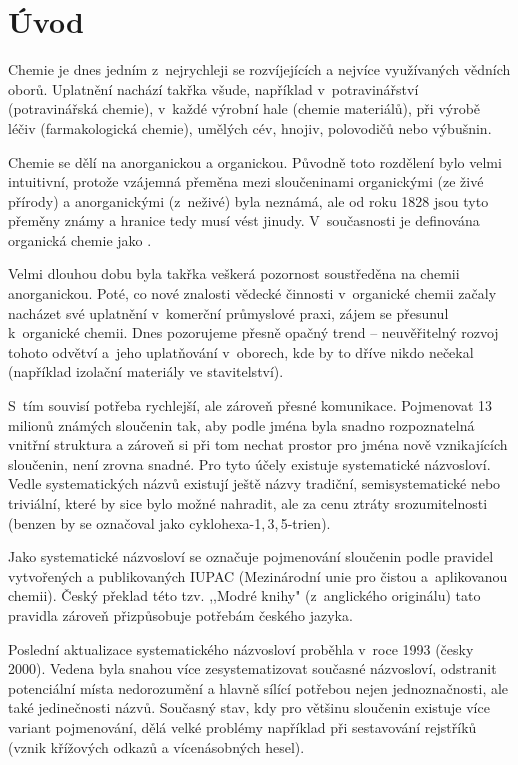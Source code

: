 \chapter{Úvod}
Chemie je dnes jedním z~nejrychleji se rozvíjejících a nejvíce využívaných
vědních oborů. Uplatnění nachází takřka všude, například v~potravinářství
(potravinářská chemie), v~každé výrobní hale (chemie materiálů), při výrobě
léčiv (farmakologická chemie), umělých cév, hnojiv, polovodičů nebo vý\-buš\-nin.

Chemie se dělí na anorganickou a organickou. Původně toto rozdělení bylo velmi
intuitivní, protože vzájemná přeměna mezi sloučeninami organickými (ze živé
přírody) a anorganickými (z~neživé) byla neznámá, ale od roku 1828 jsou tyto
přeměny známy a hranice tedy musí vést jinudy. V~současnosti je definována
organická chemie jako .

Velmi dlouhou dobu byla takřka veškerá pozornost soustředěna na chemii
anorganickou. Poté, co nové znalosti vědecké činnosti v~organické chemii začaly
nacházet své uplatnění v~komerční průmyslové praxi, zájem se pře\-su\-nul
k~organické chemii. Dnes pozorujeme přesně opačný trend -- neuvěřitelný rozvoj
tohoto odvětví a~jeho uplatňování v~oborech, kde by to dříve nikdo nečekal
(například izolační materiály ve stavitelství).

S~tím souvisí potřeba rychlejší, ale zároveň přesné komunikace. Pojmenovat
13\,milionů známých sloučenin tak, aby podle jména byla snadno rozpoznatelná
vnitřní struktura a zároveň si při tom nechat prostor pro jména nově
vznikajících sloučenin, není zrovna snadné. Pro tyto účely existuje systematické
názvosloví. Vedle systematických názvů existují ještě názvy tradiční,
semisystematické nebo triviální, které by sice bylo možné nahradit, ale za cenu
ztráty srozumitelnosti (benzen by se označoval jako cyklohexa-1,\,3,\,5-trien).

Jako systematické názvosloví se označuje pojmenování sloučenin podle pravidel
vytvořených a publikovaných IUPAC (Mezinárodní unie pro čistou a~aplikovanou
chemii). Český překlad této tzv. ,,Modré knihy" (z~anglického originálu) tato
pravidla zároveň přizpůsobuje potřebám českého jazyka.

Poslední aktualizace systematického názvosloví proběhla v~roce 1993
(čes\-ky 2000)\cite{IUPAC:bluebook,Kahovec:modrakniha}. Vedena byla snahou více
zesystematizovat současné názvosloví, odstranit potenciální místa nedorozumění
a hlavně sílící potřebou nejen jednoznačnosti, ale také jedinečnosti názvů.
Současný stav, kdy pro většinu sloučenin existuje více variant pojmenování, dělá
velké problémy například při sestavování rejstříků (vznik křížových odkazů a
vícenásobných hesel)\cite{Schejbalova:organa}.

